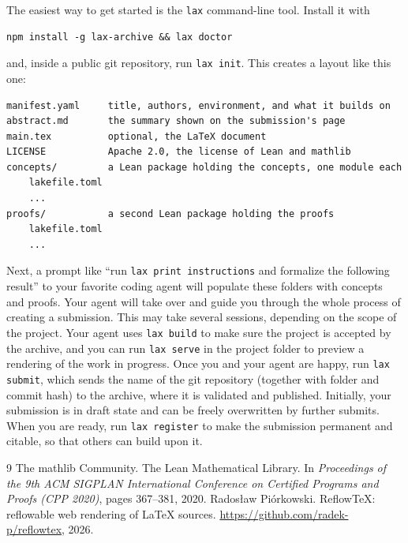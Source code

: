 \documentclass[11pt]{article}
\theoremstyle{plain}
\theoremstyle{definition}
\begin{document}
The easiest way to get started is the \texttt{lax} command-line tool. Install
it with
\begin{verbatim}
npm install -g lax-archive && lax doctor
\end{verbatim}
and, inside a public git repository, run \texttt{lax init}. This creates
a layout like this one:
\begin{verbatim}
manifest.yaml     title, authors, environment, and what it builds on
abstract.md       the summary shown on the submission's page
main.tex          optional, the LaTeX document
LICENSE           Apache 2.0, the license of Lean and mathlib
concepts/         a Lean package holding the concepts, one module each
    lakefile.toml
    ...
proofs/           a second Lean package holding the proofs
    lakefile.toml
    ...
\end{verbatim}
Next, a prompt like ``run \texttt{lax print instructions} and formalize the
following result'' to your favorite coding agent will populate these folders
with concepts and proofs. Your agent will take over and guide you through
the whole process of creating a submission. This may take several sessions,
depending on the scope of the project. Your agent uses \texttt{lax build} to
make sure the project is accepted by the archive, and you can run
\texttt{lax serve} in the project folder to preview a rendering of the work
in progress. Once you and your agent are happy, run \texttt{lax submit},
which sends the name of the git repository (together with folder and commit
hash) to the archive, where it is validated and published. Initially, your
submission is in draft state and can be freely overwritten by further
submits. When you are ready, run \texttt{lax register} to make the submission
permanent and citable, so that others can build upon it.

\begin{thebibliography}{9}
  The mathlib Community.
  The Lean Mathematical Library.
  In \emph{Proceedings of the 9th ACM SIGPLAN International Conference on
  Certified Programs and Proofs (CPP 2020)}, pages 367--381, 2020.
  Rados\l{}aw Pi\'orkowski.
  ReflowTeX: reflowable web rendering of \LaTeX{} sources.
  \url{https://github.com/radek-p/reflowtex}, 2026.
\end{thebibliography}
\end{document}
